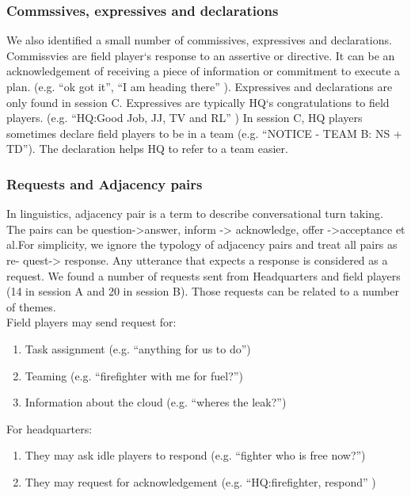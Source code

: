 \subsubsection{Commssives, expressives and declarations}
We also identified a small number of commissives, expressives and declarations. Commissvies are field player`s response to an assertive or directive. It can be an acknowledgement of receiving a piece of information or commitment to execute a plan. (e.g. ``ok got it'', ``I am heading there'' ). Expressives and declarations are only found in session C. Expressives are typically HQ`s congratulations to field players. (e.g. ``HQ:Good Job, JJ, TV and RL'' ) In session C, HQ players sometimes declare field players to be in a team (e.g. ``NOTICE - TEAM B: NS + TD''). The declaration helps HQ to refer to a team easier.\\

\subsubsection{Requests and Adjacency pairs}
In linguistics, adjacency pair is a term to describe conversational turn taking. The pairs can be question->answer, inform -> acknowledge, offer ->acceptance et al.For simplicity, we ignore the typology of adjacency pairs and treat all pairs as re- quest-> response. Any utterance that expects a response is considered as a request. We found a number of requests sent from Headquarters and field players (14 in session A and 20 in session B). Those requests can be related to a number of themes.\\

Field players may send request for: \\

\begin{enumerate}
\item Task assignment (e.g. ``anything for us to do'')
\item Teaming (e.g. ``firefighter with me for fuel?'')
\item Information about the cloud (e.g. ``wheres the leak?'')
\end{enumerate}

For headquarters:\\

\begin{enumerate}
\item They may ask idle players to respond (e.g. ``fighter who is free now?'')
\item They may request for acknowledgement (e.g. ``HQ:firefighter, respond'' )
\end{enumerate}

